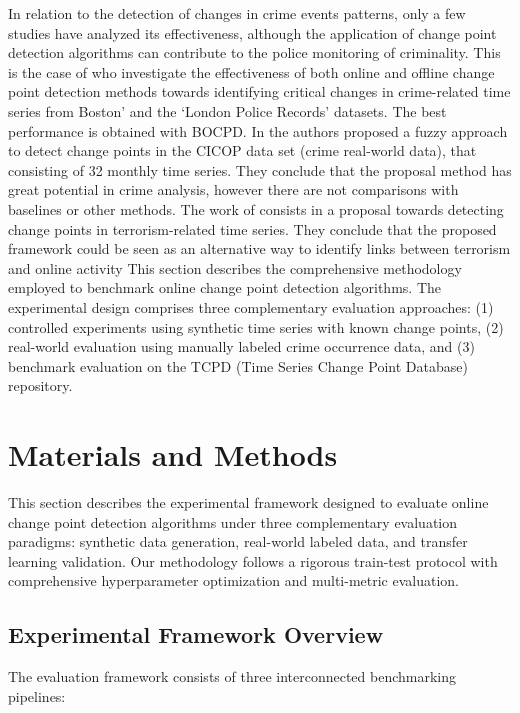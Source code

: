 \documentclass[journal,article,submit,pdftex,moreauthors]{Definitions/mdpi}
\begin{document}
In relation to the detection of changes in crime events patterns, only a few studies have analyzed its effectiveness, although the application of change point detection algorithms can contribute to the police monitoring of criminality. This is the case of \cite{konstantinou2023trend} who investigate the effectiveness of both online and offline change point detection methods towards identifying critical changes in crime-related time series from Boston’ and the ‘London Police Records’ datasets. The best performance is obtained with BOCPD. In \cite{albertetti2016change} the authors proposed a fuzzy approach to detect change points in the CICOP data set (crime real-world data), that consisting of 32 monthly time series. They conclude that the proposal method has great potential in crime analysis, however there are not comparisons with baselines or other methods.  The work of \cite{theodosiadou2021change} consists in a proposal towards detecting change points in terrorism-related time series. They conclude that the proposed framework could be seen as an alternative way to identify links between terrorism and online activity
This section describes the comprehensive methodology employed to benchmark online change point detection algorithms. The experimental design comprises three complementary evaluation approaches: (1) controlled experiments using synthetic time series with known change points, (2) real-world evaluation using manually labeled crime occurrence data, and (3) benchmark evaluation on the TCPD (Time Series Change Point Database) repository.

\section{Materials and Methods}
\label{sec:methods}

This section describes the experimental framework designed to evaluate online change point detection algorithms under three complementary evaluation paradigms: synthetic data generation, real-world labeled data, and transfer learning validation. Our methodology follows a rigorous train-test protocol with comprehensive hyperparameter optimization and multi-metric evaluation.

\subsection{Experimental Framework Overview}

The evaluation framework consists of three interconnected benchmarking pipelines:
\end{document}
